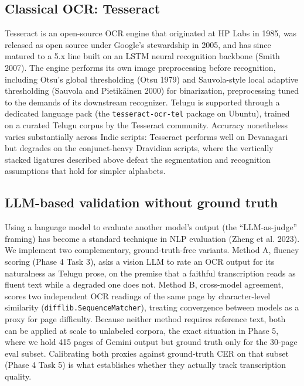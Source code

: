 \documentclass[
  letterpaper,
  DIV=11,
  numbers=noendperiod]{scrartcl}
\newcounter{none} %
\begin{document}
\subsection{Classical OCR: Tesseract}\label{classical-ocr-tesseract}

Tesseract is an open-source OCR engine that originated at HP Labs in
1985, was released as open source under Google's stewardship in 2005,
and has since matured to a 5.x line built on an LSTM neural recognition
backbone (Smith 2007). The engine performs its own image preprocessing
before recognition, including Otsu's global thresholding (Otsu 1979) and
Sauvola-style local adaptive thresholding (Sauvola and Pietikäinen 2000)
for binarization, preprocessing tuned to the demands of its downstream
recognizer. Telugu is supported through a dedicated language pack (the
\texttt{tesseract-ocr-tel} package on Ubuntu), trained on a curated
Telugu corpus by the Tesseract community. Accuracy nonetheless varies
substantially across Indic scripts: Tesseract performs well on
Devanagari but degrades on the conjunct-heavy Dravidian scripts, where
the vertically stacked ligatures described above defeat the segmentation
and recognition assumptions that hold for simpler alphabets.

\subsection{LLM-based validation without ground
truth}\label{llm-based-validation-without-ground-truth}

Using a language model to evaluate another model's output (the
``LLM-as-judge'' framing) has become a standard technique in NLP
evaluation (Zheng et al. 2023). We implement two complementary,
ground-truth-free variants. Method A, fluency scoring (Phase 4 Task 3),
asks a vision LLM to rate an OCR output for its naturalness as Telugu
prose, on the premise that a faithful transcription reads as fluent text
while a degraded one does not. Method B, cross-model agreement, scores
two independent OCR readings of the same page by character-level
similarity (\texttt{difflib.SequenceMatcher}), treating convergence
between models as a proxy for page difficulty. Because neither method
requires reference text, both can be applied at scale to unlabeled
corpora, the exact situation in Phase 5, where we hold 415 pages of
Gemini output but ground truth only for the 30-page eval subset.
Calibrating both proxies against ground-truth CER on that subset (Phase
4 Task 5) is what establishes whether they actually track transcription
quality.
\end{document}
